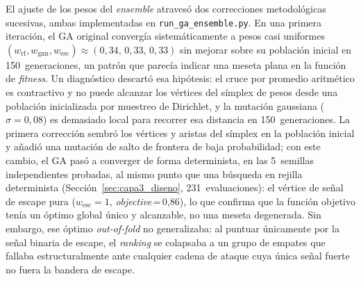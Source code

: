 El ajuste de los pesos del \textit{ensemble} atravesó dos correcciones metodológicas
sucesivas, ambas implementadas en \texttt{run\_ga\_ensemble.py}. En una primera
iteración, el \ac{GA} original convergía sistemáticamente a pesos casi uniformes
\((w_{\text{rf}}, w_{\text{gnn}}, w_{\text{esc}}) \approx (0{,}34,\, 0{,}33,\, 0{,}33)\)
sin mejorar sobre su población inicial en 150~generaciones, un patrón que parecía
indicar una meseta plana en la función de \textit{fitness}. Un diagnóstico
descartó esa hipótesis: el cruce por promedio aritmético es contractivo y no
puede alcanzar los vértices del símplex de pesos desde una población inicializada
por muestreo de Dirichlet, y la mutación gaussiana (\(\sigma=0{,}08\)) es
demasiado local para recorrer esa distancia en 150~generaciones. La primera
corrección sembró los vértices y aristas del símplex en la población inicial y
añadió una mutación de salto de frontera de baja probabilidad; con este cambio,
el \ac{GA} pasó a converger de forma determinista, en las 5~semillas
independientes probadas, al mismo punto que una búsqueda en rejilla
determinista (Sección~\ref{sec:capa3_diseno}, 231~evaluaciones): el vértice de
señal de escape pura (\(w_{\text{esc}}=1\), \textit{objective}\,=\,0,86),
lo que confirma que la función objetivo tenía un óptimo global único y alcanzable, no
una meseta degenerada. Sin embargo, ese óptimo \textit{out-of-fold} no
generalizaba: al puntuar únicamente por la señal binaria de escape, el \textit{ranking} se
colapsaba a un grupo de empates que fallaba estructuralmente ante cualquier
cadena de ataque cuya única señal fuerte no fuera la bandera de escape.

